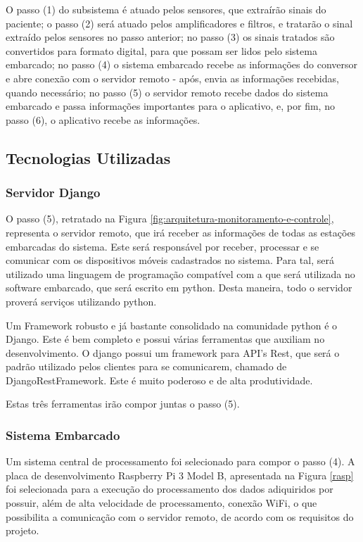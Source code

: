 O passo (1) do subsistema é atuado pelos sensores, que extraírão sinais do paciente;
o passo (2) será atuado pelos amplificadores e filtros, e tratarão o sinal
extraído pelos sensores no passo anterior; no passo (3) os sinais tratados
são convertidos para formato digital, para que possam ser lidos pelo sistema
embarcado; no passo (4) o sistema embarcado recebe as informações do conversor
e abre conexão com o servidor remoto - após, envia as informações recebidas,
quando necessário; no passo (5) o servidor remoto recebe dados do sistema
embarcado e passa informações importantes para o aplicativo, e, por fim,
no passo (6), o aplicativo recebe as informações.

\subsection{Tecnologias Utilizadas}

\subsubsection{Servidor Django}
\label{sub:servidor_django}
O passo (5), retratado na Figura \ref{fig:arquitetura-monitoramento-e-controle},
representa o servidor remoto, que irá receber as informações de todas as
estações embarcadas do sistema. Este será responsável por receber, processar
e se comunicar com os dispositivos móveis cadastrados no sistema. Para tal,
será utilizado uma linguagem de programação compatível com a que será utilizada
no software embarcado, que será escrito em python. Desta maneira, todo
o servidor proverá serviços utilizando python.

Um Framework robusto e já bastante consolidado na comunidade python é o Django.
Este é bem completo e possui várias ferramentas que auxiliam no desenvolvimento.
O django possui um framework para API's Rest, que será o padrão utilizado pelos
clientes para se comunicarem, chamado de DjangoRestFramework. Este é muito poderoso
e de alta produtividade.

Estas três ferramentas irão compor juntas o passo (5).

\subsubsection{Sistema Embarcado}
Um sistema central de processamento foi selecionado para compor o passo (4).
A placa de desenvolvimento Raspberry Pi 3 Model B, apresentada na Figura \ref{rasp} foi selecionada para
a execução do processamento dos dados adiquiridos por possuir, além de alta 
velocidade de processamento, conexão WiFi, o que possibilita a comunicação 
com o servidor remoto, de acordo com os requisitos do projeto.

